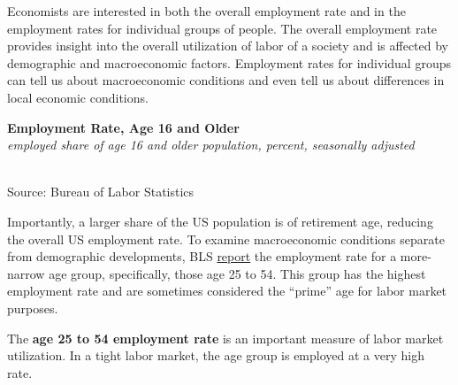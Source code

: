 \documentclass{report}
\makeatletter
\newcommand{\tbllink}[1]{\href{https://raw.githubusercontent.com/bdecon/US-chartbook/master/chartbook/data/#1}{\faTable}}
\newcommand*\short[1]{\expandafter\@gobbletwo\number\numexpr#1\relax}
\newcommand{\dateaxisticks}{
		date coordinates in=x, axis line style={draw=none},
		xmax={2023-10-01},
		max space between ticks=40,	    
		xtick={{1990-01-01}, {1992-01-01}, {1994-01-01}, 
			{1996-01-01}, {1998-01-01}, {2000-01-01}, 
			{2002-01-01}, {2004-01-01}, {2006-01-01},
			{2008-01-01}, {2010-01-01}, {2012-01-01}, {2014-01-01},
		    {2016-01-01}, {2018-01-01}, {2020-01-01}, {2022-01-01}, 
		    {2024-01-01}, {2026-01-01}},
		minor xtick={{1989-01-01}, {1991-01-01}, {1993-01-01},
			{1995-01-01}, {1997-01-01}, {1999-01-01}, 
			{2001-01-01}, {2003-01-01}, {2005-01-01}, {2007-01-01},
		    {2009-01-01}, {2011-01-01}, {2013-01-01}, {2015-01-01},
		    {2017-01-01}, {2019-01-01}, {2021-01-01}, {2023-01-01}, 
		    {2025-01-01}, {2027-01-01}},
		enlarge y limits={0.06}, enlarge x limits={0.01},
		}
\newcommand{\stdline}[4]{\addplot[very thick, no markers, color=#1] 
		table [x=#2, y=#3, col sep=comma] {#4};	}
\newcommand{\rbars}{
		\fill[color=black!10] (axis cs:{1990-07-01},\pgfkeysvalueof{/pgfplots/ymin}) rectangle 
			(axis cs:{1991-03-01}, \pgfkeysvalueof{/pgfplots/ymax});
		\fill[color=black!10] (axis cs:{2007-12-01},\pgfkeysvalueof{/pgfplots/ymin}) rectangle 
			(axis cs:{2009-07-01}, \pgfkeysvalueof{/pgfplots/ymax});
		\fill[color=black!10] (axis cs:{2001-03-01},\pgfkeysvalueof{/pgfplots/ymin}) rectangle 
			(axis cs:{2001-11-01}, \pgfkeysvalueof{/pgfplots/ymax});
		\fill[color=black!10] (axis cs:{2020-02-01},\pgfkeysvalueof{/pgfplots/ymin}) rectangle 
			(axis cs:{2020-05-01}, \pgfkeysvalueof{/pgfplots/ymax});}
\makeatother
\begin{document}
{\begin{minipage}{0.76\textwidth}
Economists are interested in both the overall employment rate and in the employment rates for individual groups of people. The overall employment rate provides insight into the overall utilization of labor of a society and is affected by demographic and macroeconomic factors. Employment rates for individual groups can tell us about macroeconomic conditions and even tell us about differences in local economic conditions. 

 
\vspace{1mm}

\normalsize \textbf{Employment Rate, Age 16 and Older}\\
\footnotesize{\textit{employed share of age 16 and older population, percent, seasonally adjusted}}\\
\hspace*{-2mm} \\
\footnotesize{Source: Bureau of Labor Statistics} \hfill \tbllink{epop.csv}
\vspace{3mm} 

\small Importantly, a larger share of the US population is of retirement age, reducing the overall US employment rate. To examine macroeconomic conditions separate from demographic developments, BLS \href{LNS12300060}{report} the employment rate for a more-narrow age group, specifically, those age 25 to 54. This group has the highest employment rate and are sometimes considered the ``prime'' age for labor market purposes. 

The \textbf{age 25 to 54 employment rate} is an important measure of labor market utilization. In a tight labor market, the age group is employed at a very high rate.  
\vspace{1mm}


\end{minipage}}
\end{document}
